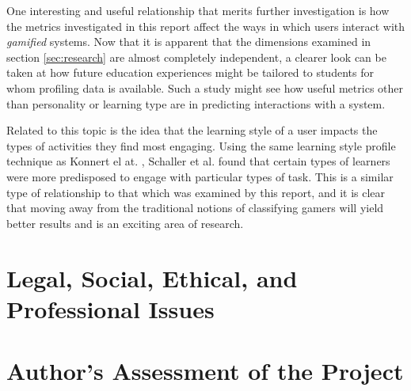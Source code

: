 \documentclass[12pt,a4paper,twoside]{report}
\begin{document}
One interesting and useful relationship that merits further investigation is how the metrics investigated in this report affect the ways in which users interact with \textit{gamified} systems. Now that it is apparent that the dimensions examined in section \ref{sec:research} are almost completely independent, a clearer look can be taken at how future education experiences might be tailored to students for whom profiling data is available. Such a study might see how useful metrics other than personality or learning type are in predicting interactions with a system.

Related to this topic is the idea that the learning style of a user impacts the types of activities they find most engaging. Using the same learning style profile technique as Konnert el at. \cite{konertmodeling}, Schaller et al. \cite{one-size} found that certain types of learners were more predisposed to engage with particular types of task. This is a similar type of relationship to that which was examined by this report, and it is clear that moving away from the traditional notions of classifying gamers will yield better results and is an exciting area of research.

\chapter{Legal, Social, Ethical, and Professional Issues}
\label{sec:issues}

\chapter{Author's Assessment of the Project}
\end{document}

